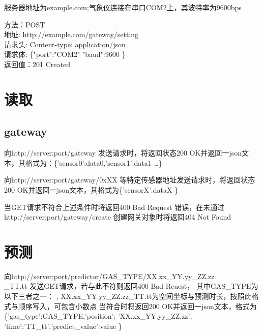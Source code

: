\documentclass[]{ctexart}
\begin{document}
服务器地址为example.com;气象仪连接在串口COM2上，其波特率为9600bps

方法：POST\\
地址: http://example.com/gateway/setting\\
请求头: Content-type: application/json\\
请求体: \{"port":"COM2" "baud":9600 \}\\
返回值：201 Created\\



\section{读取}


\subsection{gateway}
向http://server:port/gateway 发送请求时，将返回状态200 OK并返回一json文本，其格式为：\{'sensor0':data0,'sensor1':data1 \dots \}

向http://server:port/gateway/0xXX 等特定传感器地址发送请求时，将返回状态200 OK并返回一json文本，其格式为\{'sensorX':dataX \}

当GET请求不符合上述条件时将返回400 Bad Request 错误，在未通过http://server:port/gateway/create 创建网关对象时将返回404 Not Found

\section{预测}
向http://server:port/predictor/GAS\_TYPE/XX.xx\_YY.yy\_ZZ.zz\\\_TT.tt 发送GET请求，若与此不符则返回400 Bad Reuest，
其中GAS\_TYPE为以下三者之一： , XX.xx\_YY.yy\_ZZ.zz\_TT.tt为空间坐标与预测时长，按照此格式与顺序写入，可包含小数点
当符合时将返回200 OK并返回一json文本，格式为\{'gas\_type':GAS\_TYPE,'position': 'XX.xx\_YY.yy\_ZZ.zz',\\'time':'TT\_tt','predict\_value':value \}
\end{document}

